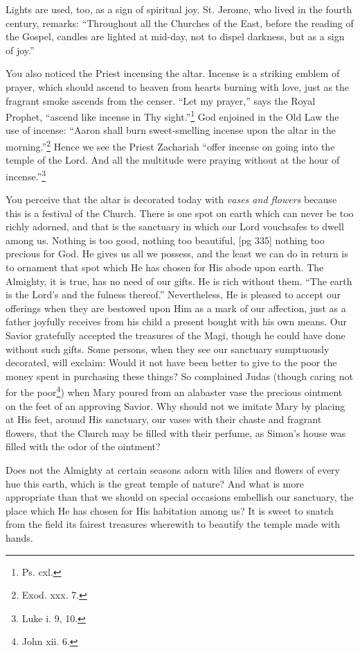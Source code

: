 Lights are used, too, as a sign of spiritual joy.
St. Jerome, who lived in the fourth century, remarks:
“Throughout all the Churches of the East,
before the reading of the Gospel, candles are
lighted at mid-day, not to dispel darkness, but as
a sign of joy.”

You also noticed the Priest incensing the altar.
Incense is a striking emblem of prayer, which
should ascend to heaven from hearts burning with
love, just as the fragrant smoke ascends from the
censer. “Let my prayer,” says the Royal
Prophet, “ascend like incense in Thy sight.”\footnote{Ps. cxl.}
God enjoined in the Old Law the use of incense:
“Aaron shall burn sweet-smelling incense upon the
altar in the morning.”\footnote{Exod.
xxx. 7.} Hence we see the Priest
Zachariah “offer incense on going into the temple
of the Lord. And all the multitude were praying
without at the hour of incense.”\footnote{Luke i. 9, 10.}

You perceive that the altar is decorated today
with \emph{vases and flowers} because this is a festival of
the Church. There is one spot on earth which
can never be too richly adorned, and that is the
sanctuary in which our Lord vouchsafes to dwell
among us. Nothing is too good, nothing too beautiful,
[pg 335]
nothing too precious for God. He gives us
all we possess, and the least we can do in return
is to ornament that spot which He has chosen for
His abode upon earth. The Almighty, it is true,
has no need of our gifts. He is rich without them.
“The earth is the Lord's and the fulness thereof.”
Nevertheless, He is pleased to accept our offerings
when they are bestowed upon Him as a mark of
our affection, just as a father joyfully receives
from his child a present bought with his own
means. Our Savior gratefully accepted the
treasures of the Magi, though he could have done
without such gifts. Some persons, when they see
our sanctuary sumptuously decorated, will exclaim:
Would it not have been better to give to
the poor the money spent in purchasing these
things? So complained Judas (though caring not
for the poor\footnote{John xii.
6.}) when Mary poured from an alabaster
vase the precious ointment on the feet of an
approving Savior. Why should not we imitate
Mary by placing at His feet, around His sanctuary,
our vases with their chaste and fragrant
flowers, that the Church may be filled with their
perfume, as Simon's house was filled with the odor
of the ointment?

Does not the Almighty at certain seasons adorn
with lilies and flowers of every hue this earth,
which is the great temple of nature? And what
is more appropriate than that we should on special
occasions embellish our sanctuary, the place which
He has chosen for His habitation among us? It
is sweet to snatch from the field its fairest treasures
wherewith to beautify the temple made with
hands.

